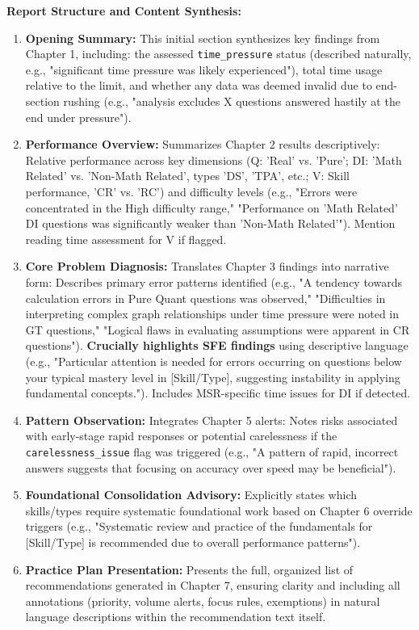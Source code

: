 \documentclass{article}
\begin{document}
\textbf{Report Structure and Content Synthesis:}
\begin{enumerate}
    \item \textbf{Opening Summary:} This initial section synthesizes key findings from Chapter 1, including: the assessed \texttt{time\_pressure} status (described naturally, e.g., "significant time pressure was likely experienced"), total time usage relative to the limit, and whether any data was deemed invalid due to end-section rushing (e.g., "analysis excludes X questions answered hastily at the end under pressure").
    \item \textbf{Performance Overview:} Summarizes Chapter 2 results descriptively: Relative performance across key dimensions (Q: 'Real' vs. 'Pure'; DI: 'Math Related' vs. 'Non-Math Related', types 'DS', 'TPA', etc.; V: Skill performance, 'CR' vs. 'RC') and difficulty levels (e.g., "Errors were concentrated in the High difficulty range," "Performance on 'Math Related' DI questions was significantly weaker than 'Non-Math Related'"). Mention reading time assessment for V if flagged.
    \item \textbf{Core Problem Diagnosis:} Translates Chapter 3 findings into narrative form: Describes primary error patterns identified (e.g., "A tendency towards calculation errors in Pure Quant questions was observed," "Difficulties in interpreting complex graph relationships under time pressure were noted in GT questions," "Logical flaws in evaluating assumptions were apparent in CR questions"). \textbf{Crucially highlights SFE findings} using descriptive language (e.g., "Particular attention is needed for errors occurring on questions below your typical mastery level in [Skill/Type], suggesting instability in applying fundamental concepts."). Includes MSR-specific time issues for DI if detected.
    \item \textbf{Pattern Observation:} Integrates Chapter 5 alerts: Notes risks associated with early-stage rapid responses or potential carelessness if the \texttt{carelessness\_issue} flag was triggered (e.g., "A pattern of rapid, incorrect answers suggests that focusing on accuracy over speed may be beneficial").
    \item \textbf{Foundational Consolidation Advisory:} Explicitly states which skills/types require systematic foundational work based on Chapter 6 override triggers (e.g., "Systematic review and practice of the fundamentals for [Skill/Type] is recommended due to overall performance patterns").
    \item \textbf{Practice Plan Presentation:} Presents the full, organized list of recommendations generated in Chapter 7, ensuring clarity and including all annotations (priority, volume alerts, focus rules, exemptions) in natural language descriptions within the recommendation text itself.

\end{enumerate}
\end{document}
